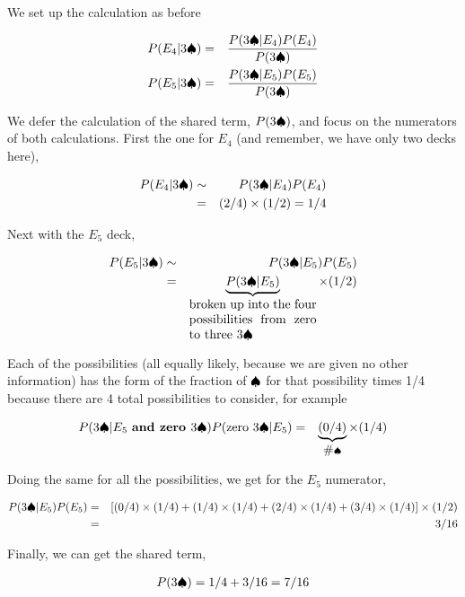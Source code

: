 \documentclass{tufte-book}
\begin{document}
We set up the calculation as before

\begin{eqnarray*}
P(E_4|3\spadesuit)&=&\frac{P(3\spadesuit|E_4)P(E_4)}{P(3\spadesuit)}\\
P(E_5|3\spadesuit)&=&\frac{P(3\spadesuit|E_5)P(E_5)}{P(3\spadesuit)}
\end{eqnarray*}

We defer the calculation of the shared term, \(P(3\spadesuit)\), and focus
on the numerators of both
calculations.
First the one for \(E_4\) (and remember, we have only two decks here),

\begin{eqnarray*}
P(E_4|3\spadesuit)&\sim&P(3\spadesuit|E_4)P(E_4)\\
&=&(2/4)\times (1/2) = 1/4
\end{eqnarray*}

Next with the \(E_5\) deck,

\begin{eqnarray*}
P(E_5|3\spades)&\sim&P(3\spades|E_5)P(E_5)\\
&=&\underbrace{P(3\spades|E_5)}_{\parbox{1.4in}{broken up into the four possibilities from zero to three $3\spades$}}\times (1/2) \\
\end{eqnarray*}

Each of the possibilities (all equally likely, because we are given no
other information) has the form of the fraction of \(\spadesuit\) for that
possibility times 1/4 because there are 4 total possibilities to
consider, for example

\begin{eqnarray*}
P(3\spadesuit|E_5\mbox{ {\bf and zero }} 3\spadesuit)P(\mbox{zero } 3\spadesuit|E_5) &=& \underbrace{(0/4)}_{\mbox{\#}\spadesuit} \times (1/4)
\end{eqnarray*}

Doing the same for all the possibilities, we get for the \(E_5\)
numerator,

\begin{eqnarray*}
P(3\spadesuit|E_5)P(E_5) &=&\left[(0/4)\times (1/4) +  (1/4)\times (1/4) +  (2/4)\times (1/4) +  (3/4)\times (1/4)\right]\times (1/2) \\
&=&3/16
\end{eqnarray*}

Finally, we can get the shared term,

\begin{eqnarray*}
P(3\spadesuit)= 1/4 + 3/16 = 7/16
\end{eqnarray*}
\end{document}
